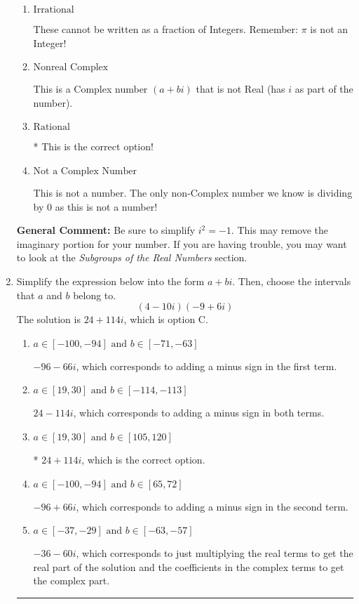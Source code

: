 \documentclass{extbook}[14pt]
\newcommand{\litem}[1]{\item #1

\rule{\textwidth}{0.4pt}}
\begin{document}
\begin{enumerate}
{\begin{enumerate}[label=\Alph*.]
This is a Complex number $(a+bi)$ that \textbf{only} has an imaginary part like $2i$.
\item \( \text{Irrational} \)

These cannot be written as a fraction of Integers. Remember: $\pi$ is not an Integer!
\item \( \text{Nonreal Complex} \)

This is a Complex number $(a+bi)$ that is not Real (has $i$ as part of the number).
\item \( \text{Rational} \)

* This is the correct option!
\item \( \text{Not a Complex Number} \)

This is not a number. The only non-Complex number we know is dividing by 0 as this is not a number!
\end{enumerate}

\textbf{General Comment:} Be sure to simplify $i^2 = -1$. This may remove the imaginary portion for your number. If you are having trouble, you may want to look at the \textit{Subgroups of the Real Numbers} section.
}
\litem{
Simplify the expression below into the form $a+bi$. Then, choose the intervals that $a$ and $b$ belong to.
\[ (4 - 10 i)(-9 + 6 i) \]The solution is \( 24 + 114 i \), which is option C.\begin{enumerate}[label=\Alph*.]
\item \( a \in [-100, -94] \text{ and } b \in [-71, -63] \)

 $-96 - 66 i$, which corresponds to adding a minus sign in the first term.
\item \( a \in [19, 30] \text{ and } b \in [-114, -113] \)

 $24 - 114 i$, which corresponds to adding a minus sign in both terms.
\item \( a \in [19, 30] \text{ and } b \in [105, 120] \)

* $24 + 114 i$, which is the correct option.
\item \( a \in [-100, -94] \text{ and } b \in [65, 72] \)

 $-96 + 66 i$, which corresponds to adding a minus sign in the second term.
\item \( a \in [-37, -29] \text{ and } b \in [-63, -57] \)

 $-36 - 60 i$, which corresponds to just multiplying the real terms to get the real part of the solution and the coefficients in the complex terms to get the complex part.
\end{enumerate}

}
\end{enumerate}
\end{document}
